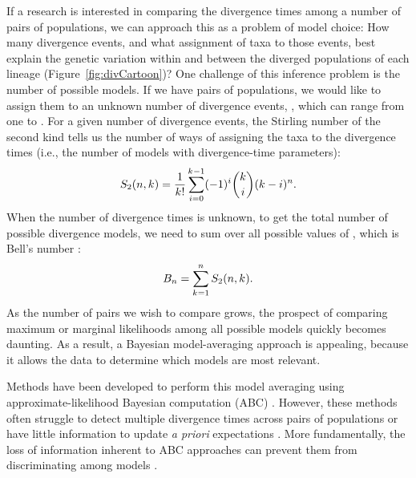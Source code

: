 \begin{linenomath}
If a research is interested in comparing the divergence times among a number of
pairs of populations,
we can approach this as a problem of model choice:
How many divergence events, and what assignment of taxa to those events, best
explain the genetic variation within and between the diverged populations of
each lineage (Figure~\ref{fig:divCartoon})?
One challenge of this inference problem is the number of possible models.
If we have \ncomparisons{} pairs of populations, we would like to assign them to an
unknown number of divergence events, \nevents{}, which can range from one to
\ncomparisons{}.
For a given number of divergence events, the Stirling number of the second kind
tells us the number of ways of assigning the taxa to the divergence times
(i.e., the number of models with \nevents{} divergence-time parameters):
\begin{equation}
    S_2(n, k_{}) = 
    \frac{1}{k_{}!} \sum_{i = 0}^{k_{} - 1} (-1)^{i}
    \binom{k_{}}{i} (k_{} - i)^{n}.
    \label{eq:stirling2}
\end{equation}
When the number of divergence times is unknown, to get the total number of
possible divergence models, we need to sum over all possible values of
\nevents{}, which is Bell's number \citep{Bell1934}:
\begin{equation}
    B_{n} = \sum_{k_{} = 1}^{n}
    S_2(n, k_{}).
    \label{eq:bell}
\end{equation}
As the number of pairs we wish to compare grows, the prospect of comparing
maximum or marginal likelihoods among all possible models quickly becomes
daunting.
As a result, a Bayesian model-averaging approach is appealing, because it
allows the data to determine which models are most relevant.
\end{linenomath}

Methods have been developed to perform this model averaging using
approximate-likelihood Bayesian computation (ABC)
\citep{Hickerson2006,Huang2011,Oaks2014dpp}.
However, these methods often struggle to detect multiple divergence times
across pairs of populations \citep{Oaks2012, Oaks2014reply} or have little
information to update \emph{a priori} expectations \citep{Oaks2014dpp}.
More fundamentally, the loss of information inherent to ABC approaches can
prevent them from discriminating among models
\citep{Robert2011,Marin2014,Green2015}.

